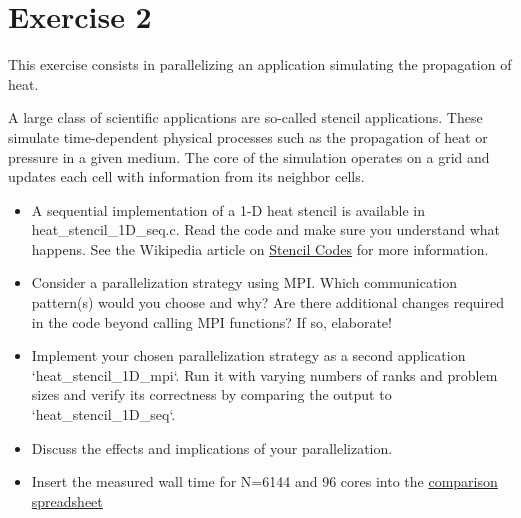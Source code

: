 \documentclass[UTF-8]{article}
\begin{document}
    
    
    \section*{Exercise 2}
	This exercise consists in parallelizing an application simulating the propagation of heat.
	
	A large class of scientific applications are so-called stencil applications. These simulate time-dependent physical processes such as the propagation of heat or pressure in a given medium. The core of the simulation operates on a grid and updates each cell with information from its neighbor cells.
	
	
	\begin{itemize}
		\item A sequential implementation of a 1-D heat stencil is available in heat\_stencil\_1D\_seq.c. Read the code and make sure you understand what happens. See the Wikipedia article on \href{https://en.wikipedia.org/wiki/Stencil_code}{Stencil Codes} for more information.
		\item Consider a parallelization strategy using MPI. Which communication pattern(s) would you choose and why? Are there additional changes required in the code beyond calling MPI functions? If so, elaborate!
		\item Implement your chosen parallelization strategy as a second application `heat\_stencil\_1D\_mpi`. Run it with varying numbers of ranks and problem sizes and verify its correctness by comparing the output to `heat\_stencil\_1D\_seq`.
		\item Discuss the effects and implications of your parallelization.
		\item Insert the measured wall time for N=6144 and 96 cores into the  \href{https://docs.google.com/spreadsheets/d/1p6d9F12EtykmI2-7MnHkg0U15UAtaCvWz8Ip92ZEsWo}{comparison spreadsheet}
	\end{itemize}
\end{document}
